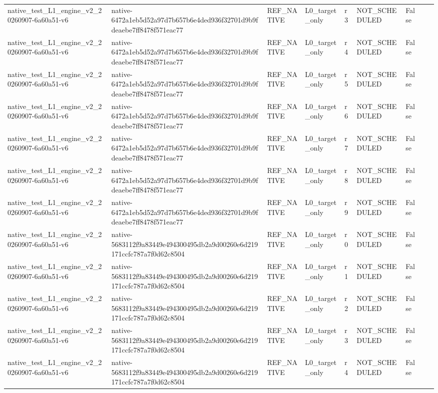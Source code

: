 \begin{tabular}{lllllllll}
native\_test\_L1\_engine\_v2\_20260907-6a60a51-v6 & native-6472a1eb5d52a97d7b657b6e4ded936f32701d9b9fdeaebe7ff8478f571eac77 & REF\_NATIVE & L0\_target\_only & r3 & NOT\_SCHEDULED & False &  &  \\
native\_test\_L1\_engine\_v2\_20260907-6a60a51-v6 & native-6472a1eb5d52a97d7b657b6e4ded936f32701d9b9fdeaebe7ff8478f571eac77 & REF\_NATIVE & L0\_target\_only & r4 & NOT\_SCHEDULED & False &  &  \\
native\_test\_L1\_engine\_v2\_20260907-6a60a51-v6 & native-6472a1eb5d52a97d7b657b6e4ded936f32701d9b9fdeaebe7ff8478f571eac77 & REF\_NATIVE & L0\_target\_only & r5 & NOT\_SCHEDULED & False &  &  \\
native\_test\_L1\_engine\_v2\_20260907-6a60a51-v6 & native-6472a1eb5d52a97d7b657b6e4ded936f32701d9b9fdeaebe7ff8478f571eac77 & REF\_NATIVE & L0\_target\_only & r6 & NOT\_SCHEDULED & False &  &  \\
native\_test\_L1\_engine\_v2\_20260907-6a60a51-v6 & native-6472a1eb5d52a97d7b657b6e4ded936f32701d9b9fdeaebe7ff8478f571eac77 & REF\_NATIVE & L0\_target\_only & r7 & NOT\_SCHEDULED & False &  &  \\
native\_test\_L1\_engine\_v2\_20260907-6a60a51-v6 & native-6472a1eb5d52a97d7b657b6e4ded936f32701d9b9fdeaebe7ff8478f571eac77 & REF\_NATIVE & L0\_target\_only & r8 & NOT\_SCHEDULED & False &  &  \\
native\_test\_L1\_engine\_v2\_20260907-6a60a51-v6 & native-6472a1eb5d52a97d7b657b6e4ded936f32701d9b9fdeaebe7ff8478f571eac77 & REF\_NATIVE & L0\_target\_only & r9 & NOT\_SCHEDULED & False &  &  \\
native\_test\_L1\_engine\_v2\_20260907-6a60a51-v6 & native-5683112f9a83449e494300495db2a9d00260e6d219171ccfc787a7f0d62c8504 & REF\_NATIVE & L0\_target\_only & r0 & NOT\_SCHEDULED & False &  &  \\
native\_test\_L1\_engine\_v2\_20260907-6a60a51-v6 & native-5683112f9a83449e494300495db2a9d00260e6d219171ccfc787a7f0d62c8504 & REF\_NATIVE & L0\_target\_only & r1 & NOT\_SCHEDULED & False &  &  \\
native\_test\_L1\_engine\_v2\_20260907-6a60a51-v6 & native-5683112f9a83449e494300495db2a9d00260e6d219171ccfc787a7f0d62c8504 & REF\_NATIVE & L0\_target\_only & r2 & NOT\_SCHEDULED & False &  &  \\
native\_test\_L1\_engine\_v2\_20260907-6a60a51-v6 & native-5683112f9a83449e494300495db2a9d00260e6d219171ccfc787a7f0d62c8504 & REF\_NATIVE & L0\_target\_only & r3 & NOT\_SCHEDULED & False &  &  \\
native\_test\_L1\_engine\_v2\_20260907-6a60a51-v6 & native-5683112f9a83449e494300495db2a9d00260e6d219171ccfc787a7f0d62c8504 & REF\_NATIVE & L0\_target\_only & r4 & NOT\_SCHEDULED & False &  &  \\

\end{tabular}
